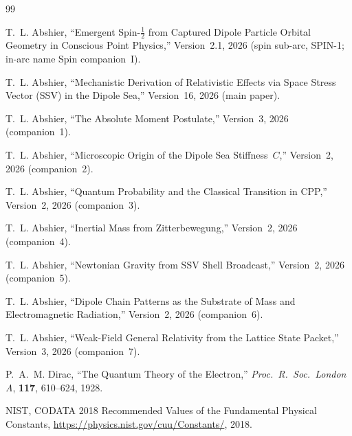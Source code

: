 \documentclass[12pt]{article}
\begin{document}
\begin{thebibliography}{99}

T.~L. Abshier,
``Emergent Spin-$\tfrac{1}{2}$ from Captured Dipole Particle Orbital
Geometry in Conscious Point Physics,''
Version~2.1, 2026 (spin sub-arc, SPIN-1; in-arc name Spin companion~I).

T.~L. Abshier,
``Mechanistic Derivation of Relativistic Effects via Space Stress
Vector (SSV) in the Dipole Sea,''
Version~16, 2026 (main paper).

T.~L. Abshier,
``The Absolute Moment Postulate,''
Version~3, 2026 (companion~1).

T.~L. Abshier,
``Microscopic Origin of the Dipole Sea Stiffness~$C$,''
Version~2, 2026 (companion~2).

T.~L. Abshier,
``Quantum Probability and the Classical Transition in CPP,''
Version~2, 2026 (companion~3).

T.~L. Abshier,
``Inertial Mass from Zitterbewegung,''
Version~2, 2026 (companion~4).

T.~L. Abshier,
``Newtonian Gravity from SSV Shell Broadcast,''
Version~2, 2026 (companion~5).

T.~L. Abshier,
``Dipole Chain Patterns as the Substrate of Mass and
Electromagnetic Radiation,''
Version~2, 2026 (companion~6).

T.~L. Abshier,
``Weak-Field General Relativity from the Lattice State Packet,''
Version~3, 2026 (companion~7).

P.~A.~M. Dirac,
``The Quantum Theory of the Electron,''
\textit{Proc.\ R.\ Soc.\ London A}, \textbf{117}, 610--624, 1928.

NIST, CODATA 2018 Recommended Values of the Fundamental Physical
Constants,
\url{https://physics.nist.gov/cuu/Constants/}, 2018.

\end{thebibliography}
\end{document}
